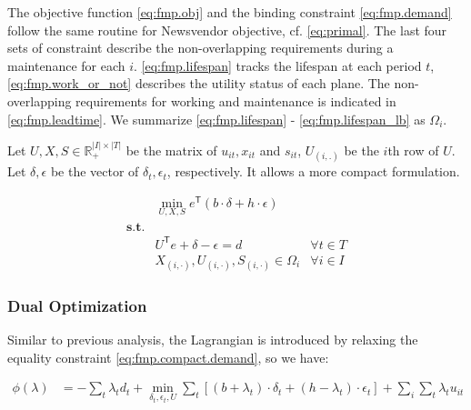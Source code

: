 \documentclass[../main]{subfiles}
\begin{document}
The objective function \eqref{eq:fmp.obj} and the binding constraint \eqref{eq:fmp.demand} follow the same routine for Newsvendor objective, cf. \eqref{eq:primal}.
The last four sets of constraint describe the non-overlapping requirements during a maintenance for each \(i\).
\eqref{eq:fmp.lifespan} tracks the lifespan at each period \(t\), \eqref{eq:fmp.work_or_not} describes the utility status of each plane.
The non-overlapping requirements for working and maintenance is indicated in \eqref{eq:fmp.leadtime}.
We summarize \eqref{eq:fmp.lifespan} - \eqref{eq:fmp.lifespan_lb} as \(\Omega_i\).

Let \(U, X, S \in \mathbb R^{|I|\times |T|}_+\) be the matrix of
\(u_{it}, x_{it}\) and \(s_{it}\), \(U_{(i,.)}\) be the \(i\)th row of
\(U\). Let \(\delta, \epsilon\) be the vector of
\(\delta_t, \epsilon_t\), respectively. It allows a more compact
formulation.

\begin{align}
                                & \min_{U, X, S}  e^\mathsf{T} (b\cdot  \delta + h \cdot \epsilon)                   \\
  \nonumber \mathbf{s.t.}       &                                                                                    \\
  \label{eq:fmp.compact.demand} & U^\mathsf{T} e + \delta - \epsilon = d                           & \forall t \in T \\
                                & X_{(i,\cdot)}, U_{(i,\cdot)}, S_{(i,\cdot)} \in \Omega_i         & \forall i \in I
\end{align}




\subsubsection{Dual Optimization}\label{sec:fmp.dual_opt}

Similar to previous analysis, the Lagrangian is introduced by relaxing the equality constraint \eqref{eq:fmp.compact.demand},
so we have:

\[\begin{aligned}
    \phi(\lambda) & = - \sum_t \lambda_t d_t + \min_{\delta_t, \epsilon_t, U} \sum_t \left [ (b + \lambda_t) \cdot \delta_t + (h-\lambda_t)\cdot \epsilon_t \right ] + \sum_i \sum_t\lambda_t u_{it} \\
  \end{aligned}\]
\end{document}
